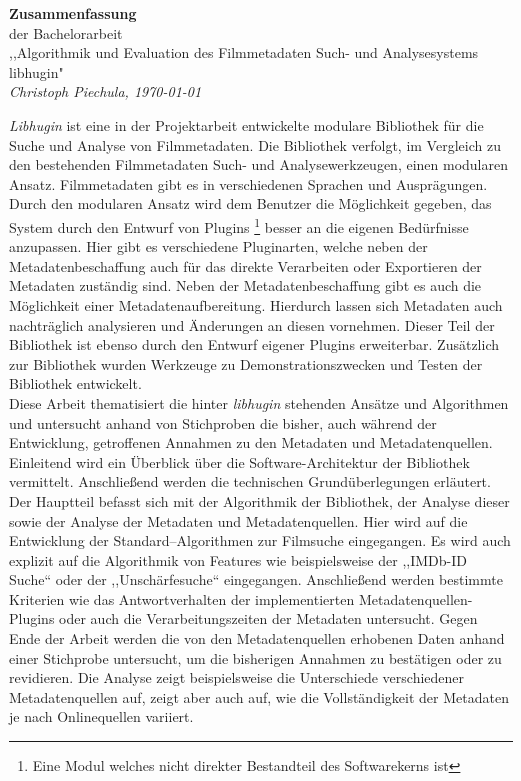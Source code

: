 \documentclass{scrartcl}
\begin{document}
\begin{center}
    \LARGE \textbf{Zusammenfassung} \\
    \vspace{.1in}
    \large der Bachelorarbeit \\
    \vspace{.1in}
    \small ,,Algorithmik und Evaluation des Filmmetadaten Such- und
    Analysesystems libhugin" \\
    \vspace{.1in}
    \small \textit{Christoph Piechula, \today}
    \vspace{.2in}
\end{center}

\textit{Libhugin} ist eine in der Projektarbeit \cite{cpiechula} entwickelte
modulare Bibliothek für die Suche und Analyse von Filmmetadaten. Die Bibliothek
verfolgt, im Vergleich zu den bestehenden Filmmetadaten Such- und
Analysewerkzeugen, einen modularen Ansatz. Filmmetadaten gibt es in
verschiedenen Sprachen und Ausprägungen. Durch den modularen Ansatz wird dem
Benutzer die Möglichkeit gegeben, das System durch den Entwurf von Plugins
\footnote{Eine Modul welches nicht direkter Bestandteil des Softwarekerns ist}
besser an die eigenen Bedürfnisse anzupassen. Hier gibt es verschiedene
Pluginarten, welche neben der Metadatenbeschaffung auch für das direkte
Verarbeiten oder Exportieren der Metadaten zuständig sind. Neben der
Metadatenbeschaffung gibt es auch die Möglichkeit einer Metadatenaufbereitung.
Hierdurch lassen sich Metadaten auch nachträglich analysieren und Änderungen an
diesen vornehmen. Dieser Teil der Bibliothek ist ebenso durch den Entwurf eigener
Plugins erweiterbar. Zusätzlich zur Bibliothek wurden Werkzeuge zu
Demonstrationszwecken und Testen der Bibliothek entwickelt.
\\

Diese Arbeit thematisiert die hinter \textit{libhugin} stehenden Ansätze und
Algorithmen und untersucht anhand von Stichproben die bisher, auch während der
Entwicklung, getroffenen Annahmen zu den Metadaten und Metadatenquellen.
Einleitend wird ein Überblick über die Software-Architektur der Bibliothek
vermittelt.  Anschließend werden die technischen Grundüberlegungen erläutert.
Der Hauptteil befasst sich mit der Algorithmik der Bibliothek, der Analyse
dieser sowie der Analyse der Metadaten und Metadatenquellen. Hier wird auf die
Entwicklung der Standard--Algorithmen zur Filmsuche eingegangen. Es wird auch
explizit auf die Algorithmik von Features wie beispielsweise der ,,IMDb-ID
Suche`` oder der ,,Unschärfesuche`` eingegangen. Anschließend werden bestimmte
Kriterien wie das Antwortverhalten der implementierten Metadatenquellen-Plugins
oder auch die Verarbeitungszeiten der Metadaten untersucht. Gegen Ende der
Arbeit werden die von den Metadatenquellen erhobenen Daten anhand einer
Stichprobe untersucht, um die bisherigen Annahmen zu bestätigen oder zu
revidieren. Die Analyse zeigt beispielsweise die Unterschiede verschiedener
Metadatenquellen auf, zeigt aber auch auf, wie die Vollständigkeit der Metadaten
je nach Onlinequellen variiert.  
\\
\end{document}
